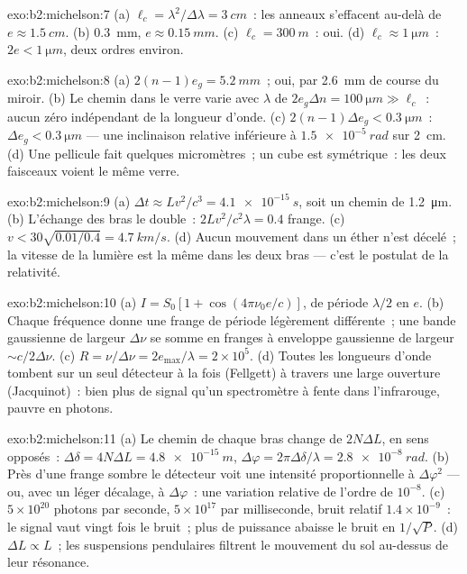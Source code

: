 \begin{solution}{exo:b2:michelson:7}
(a) $\ell_c = \lambda^2/\Delta\lambda = \qty{3}{cm}$~: les anneaux s'effacent au-delà de $e \approx \qty{1.5}{cm}$. (b)
\qty{0.3}{mm}, $e \approx \qty{0.15}{mm}$. (c) $\ell_c = \qty{300}{m}$~: oui. (d) $\ell_c \approx \qty{1}{\micro m}$~:
$2e < \qty{1}{\micro m}$, deux ordres environ.
\end{solution}

\begin{solution}{exo:b2:michelson:8}
(a) $2(n - 1)e_g = \qty{5.2}{mm}$~; oui, par \qty{2.6}{mm} de course du miroir. (b) Le
chemin dans le verre varie avec $\lambda$ de $2e_g\Delta n = \qty{100}{\micro m} \gg \ell_c$~: aucun
zéro indépendant de la longueur d'onde. (c) $2(n - 1)\Delta e_g < \qty{0.3}{\micro m}$~: $\Delta e_g <
\qty{0.3}{\micro m}$ --- une inclinaison relative inférieure à $\qty{1.5e-5}{rad}$ sur \qty{2}{cm}. (d) Une
pellicule fait quelques micromètres~; un cube est symétrique~: les deux faisceaux voient
le même verre.
\end{solution}

\begin{solution}{exo:b2:michelson:9}
(a) $\Delta t \approx Lv^2/c^3 = \qty{4.1e-15}{s}$, soit un chemin de \qty{1.2}{\micro m}. (b) L'échange des
bras le double~: $2Lv^2/c^2\lambda = 0.4$ frange. (c) $v < 30\sqrt{0.01/0.4} =
\qty{4.7}{km/s}$. (d) Aucun mouvement dans un éther n'est décelé~; la vitesse de la lumière
est la même dans les deux bras --- c'est le postulat de la relativité.
\end{solution}

\begin{solution}{exo:b2:michelson:10}
(a) $I = S_0[1 + \cos(4\pi\nu_0e/c)]$, de période $\lambda/2$ en $e$. (b) Chaque fréquence
donne une frange de période légèrement différente~; une bande gaussienne de largeur
$\Delta\nu$ se somme en franges à enveloppe gaussienne de largeur $\sim c/2\Delta\nu$.
(c) $R = \nu/\Delta\nu = 2e_{\max}/\lambda = 2 \times 10^5$. (d) Toutes les longueurs d'onde tombent sur
un seul détecteur à la fois (Fellgett) à travers une large ouverture (Jacquinot)~:
bien plus de signal qu'un spectromètre à fente dans l'infrarouge, pauvre en
photons.
\end{solution}

\begin{solution}{exo:b2:michelson:11}
(a) Le chemin de chaque bras change de $2N\Delta L$, en sens opposés~: $\Delta\delta = 4N\Delta L
= \qty{4.8e-15}{m}$, $\Delta\varphi = 2\pi\Delta\delta/\lambda = \qty{2.8e-8}{rad}$. (b) Près d'une frange
sombre le détecteur voit une intensité proportionnelle à $\Delta\varphi^2$ --- ou,
avec un léger décalage, à $\Delta\varphi$~: une variation relative de l'ordre de $10^{-8}$. (c)
$5 \times 10^{20}$ photons par seconde, $5 \times 10^{17}$ par milliseconde, bruit
relatif $1.4 \times 10^{-9}$~: le signal vaut vingt fois le bruit~; plus de puissance
abaisse le bruit en $1/\sqrt P$. (d) $\Delta L \propto L$~; les suspensions pendulaires
filtrent le mouvement du sol au-dessus de leur résonance.
\end{solution}

